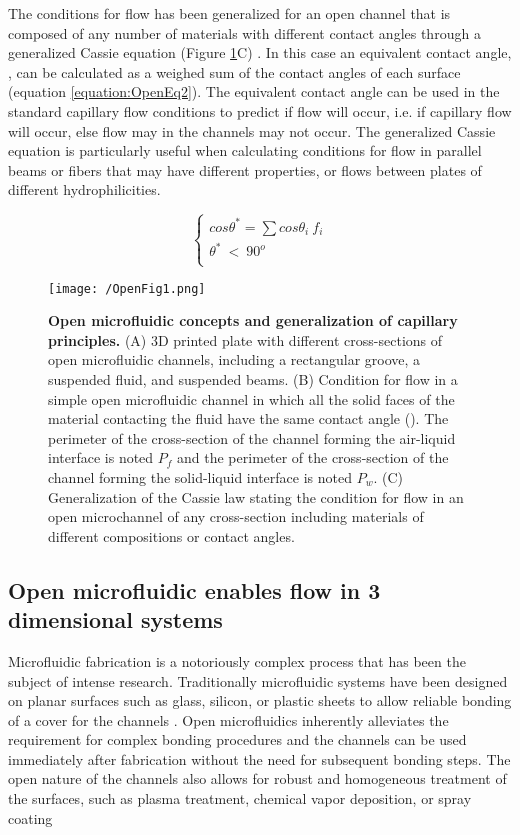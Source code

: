 The conditions for flow has been generalized for an open channel that is composed of any number of materials with different contact angles through a generalized Cassie equation (Figure \ref{figure:OpenFig1}C) \cite{Berthier2015c}. In this case an equivalent contact angle, , can be calculated as a weighed sum of the contact angles of each surface (equation \ref{equation:OpenEq2}). The equivalent contact angle  can be used in the standard capillary flow conditions to predict if flow will occur, i.e. if  capillary flow will occur, else flow may in the channels may not occur. The generalized Cassie equation is particularly useful when calculating conditions for flow in parallel beams or fibers that may have different properties, or flows between plates of different hydrophilicities.

\begin{equation}
    \left\{
\begin{array}{ll}
cos \theta^{*} =  \sum cos\theta_{i} \ f_{i}\\
\theta^{*} \ < \ 90^{o}\\
\end{array}
\right.
\label{equation:OpenEq2}
\end{equation}

\begin{figure}[h!] %
\centering
\texttt{[image: /OpenFig1.png]}
\caption[\textbf{Open microfluidic concepts and generalization of capillary principles}]{\textbf{Open microfluidic concepts and generalization of capillary principles.} (A) 3D printed plate with different cross-sections of open microfluidic channels, including a rectangular groove, a suspended fluid, and suspended beams. (B) Condition for flow in a simple open microfluidic channel in which all the solid faces of the material contacting the fluid have the same contact angle (\texttheta). The perimeter of the cross-section of the channel forming the air-liquid interface is noted $P_f$ and the perimeter of the cross-section of the channel forming the solid-liquid interface is noted $P_w$. (C) Generalization of the Cassie law stating the condition for flow in an open microchannel of any cross-section including materials of different compositions or contact angles.}
\label{figure:OpenFig1}
\end{figure}


\subsection{Open microfluidic enables flow in 3 dimensional systems}
Microfluidic fabrication is a notoriously complex process that has been the subject of intense research. Traditionally microfluidic systems have been designed on planar surfaces such as glass, silicon, or plastic sheets to allow reliable bonding of a cover for the channels \cite{Andersson2003, Rodriguez2003, Iliescu2012}. Open microfluidics inherently alleviates the requirement for complex bonding procedures and the channels can be used immediately after fabrication without the need for subsequent bonding steps. The open nature of the channels also allows for robust and homogeneous treatment of the surfaces, such as plasma treatment, chemical vapor deposition, or spray coating \cite{Casavant2013, Hong2012}

